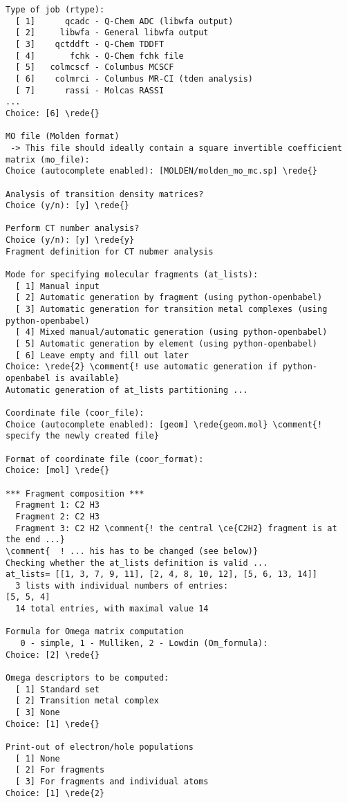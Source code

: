 \documentclass[DIV=12,headings=normal]{scrartcl}
\newcommand{\comment}[1]{\textcolor{blue}{#1}}
\newcommand{\redl}[1]{{\textcolor{red}{\texttt{#1}}}}
\newcommand{\rede}[1]{\redl{#1 <ENTER>}}
\newcounter{number}
\begin{document}
\scriptsize
\begin{Verbatim}[commandchars=\\\{\}]
Type of job (rtype):
  [ 1]      qcadc - Q-Chem ADC (libwfa output)
  [ 2]     libwfa - General libwfa output
  [ 3]    qctddft - Q-Chem TDDFT
  [ 4]       fchk - Q-Chem fchk file
  [ 5]   colmcscf - Columbus MCSCF
  [ 6]    colmrci - Columbus MR-CI (tden analysis)
  [ 7]      rassi - Molcas RASSI
...
Choice: [6] \rede{}

MO file (Molden format)
 -> This file should ideally contain a square invertible coefficient matrix (mo_file):
Choice (autocomplete enabled): [MOLDEN/molden_mo_mc.sp] \rede{}

Analysis of transition density matrices?
Choice (y/n): [y] \rede{}

Perform CT number analysis?
Choice (y/n): [y] \rede{y}
Fragment definition for CT nubmer analysis

Mode for specifying molecular fragments (at_lists):
  [ 1] Manual input
  [ 2] Automatic generation by fragment (using python-openbabel)
  [ 3] Automatic generation for transition metal complexes (using python-openbabel)
  [ 4] Mixed manual/automatic generation (using python-openbabel)
  [ 5] Automatic generation by element (using python-openbabel)
  [ 6] Leave empty and fill out later
Choice: \rede{2} \comment{! use automatic generation if python-openbabel is available}
Automatic generation of at_lists partitioning ...

Coordinate file (coor_file):
Choice (autocomplete enabled): [geom] \rede{geom.mol} \comment{! specify the newly created file}

Format of coordinate file (coor_format):
Choice: [mol] \rede{}

*** Fragment composition ***
  Fragment 1: C2 H3
  Fragment 2: C2 H3
  Fragment 3: C2 H2 \comment{! the central \ce{C2H2} fragment is at the end ...}
\comment{  ! ... his has to be changed (see below)}
Checking whether the at_lists definition is valid ...
at_lists= [[1, 3, 7, 9, 11], [2, 4, 8, 10, 12], [5, 6, 13, 14]]
  3 lists with individual numbers of entries:
[5, 5, 4]
  14 total entries, with maximal value 14

Formula for Omega matrix computation
   0 - simple, 1 - Mulliken, 2 - Lowdin (Om_formula):
Choice: [2] \rede{}

Omega descriptors to be computed:
  [ 1] Standard set
  [ 2] Transition metal complex
  [ 3] None
Choice: [1] \rede{}

Print-out of electron/hole populations
  [ 1] None
  [ 2] For fragments
  [ 3] For fragments and individual atoms
Choice: [1] \rede{2}


\end{Verbatim}
\end{document}
